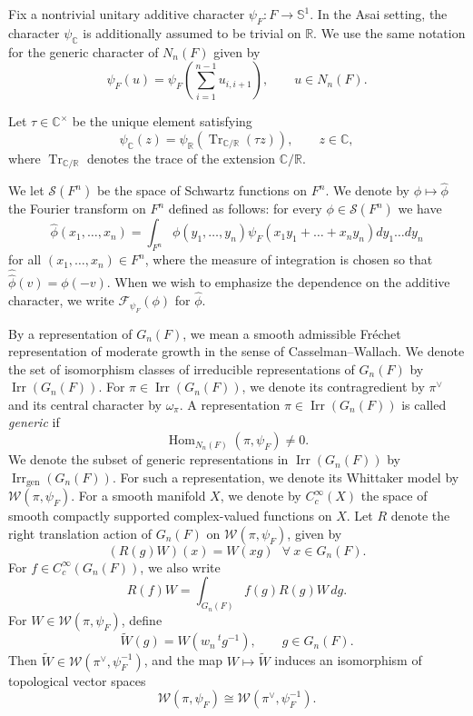 \documentclass[12pt,reqno]{amsart}
\numberwithin{equation}{section}%
\numberwithin{equation}{subsection}
\theoremstyle{definition}
\theoremstyle{remark}
\begin{document}
Fix a nontrivial unitary additive character
\(\psi_F\colon F\to\mathbb S^1\). In the Asai setting, the character
\(\psi_{\mathbb C}\) is additionally assumed to be trivial on
\(\mathbb R\). We use the same notation for the
generic character of $N_n(F)$ given by
\[
\psi_F(u)=\psi_F\left(\sum_{i=1}^{n-1}u_{i,i+1}\right), \qquad u\in N_n(F).
\]

Let \(\tau\in\mathbb C^\times\) be the unique element satisfying
\[
\psi_{\mathbb C}(z)
=\psi_{\mathbb R}(\operatorname{Tr}_{\mathbb C/\mathbb R}(\tau z)),
\qquad z\in\mathbb C,
\]
where $\operatorname{Tr}_{\mathbb{C}/\mathbb{R}}$ denotes the trace of the extension $\mathbb{C}/\mathbb{R}$.

We let $\mathcal{S}(F^n)$ be the space of Schwartz functions on $F^n$. We denote by $\phi \mapsto \widehat{\phi}$ the Fourier transform on $F^n$ defined as follows: for every $\phi \in \mathcal{S}(F^n)$ we have $$ \widehat{\phi}\left(x_1, \ldots, x_n\right)=\int_{F^n} \phi\left(y_1, \ldots, y_n\right) \psi_{F}\left(x_1 y_1+\ldots+x_n y_n\right) d y_1 \ldots d y_n $$ for all $\left(x_1, \ldots, x_n\right) \in F^n$, where the measure of integration is chosen so that $\widehat{\widehat{\phi}}(v)=\phi(-v)$. When we wish to emphasize the dependence on the additive character, we
write \(\mathcal{F}_{\psi_F}(\phi)\) for \(\widehat{\phi}\).

By a representation of $G_n(F)$, we mean a smooth admissible
Fr\'echet representation of moderate growth in the sense of
Casselman--Wallach. We denote the set of isomorphism classes of irreducible representations of \( G_n(F) \) by \( \operatorname{Irr}(G_n(F)) \). For $\pi\in\operatorname{Irr}(G_n(F))$, we denote its contragredient by $\pi^\vee$ and its central character by $\omega_\pi$.  A representation $\pi\in\operatorname{Irr}(G_n(F))$ is called \emph{generic} if
$$\operatorname{Hom}_{N_n(F)}(\pi,\psi_F)\neq 0.$$ We denote the subset of generic representations in \(\operatorname{Irr}(G_n(F))\) by \(\operatorname{Irr}_{\mathrm{gen}}(G_n(F))\). For such a
representation, we denote its Whittaker model by
$\mathcal{W}(\pi,\psi_F)$. For a smooth manifold \(X\), we denote by
\(C_c^\infty(X)\) the space of smooth compactly supported
complex-valued functions on \(X\). Let \(R\) denote the right translation action of
\(G_n(F)\) on \(\mathcal{W}(\pi,\psi_{F})\), given by
\[
(R(g)W)(x)=W(xg)\>\>\>\forall\>x \in G_n(F).
\] For \(f\in C_c^\infty(G_n(F))\), we also write
\[
R(f)W
=
\int_{G_n(F)} f(g)R(g)W\,dg.
\]
For $W\in\mathcal{W}(\pi,\psi_F)$, define
\[
\widetilde{W}(g)=W\left(w_n\,{}^tg^{-1}\right),
\qquad g\in G_n(F).
\]
Then $\widetilde{W}\in
\mathcal{W}(\pi^{\vee},\psi_F^{-1})$, and the map
$W\mapsto\widetilde{W}$ induces an isomorphism of topological vector
spaces
\[
\mathcal{W}(\pi,\psi_F)
\cong
\mathcal{W}(\pi^{\vee},\psi_F^{-1}).
\]
\end{document}
